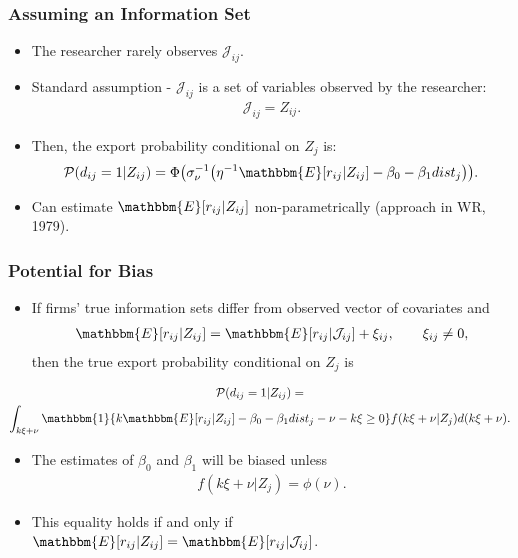 \begin{frame}
\frametitle{Assuming an Information Set}

\begin{itemize}
	\item The researcher rarely observes $\mathcal{J}_{ij}$.
	\item Standard assumption - $\mathcal{J}_{ij}$ is a set of variables observed by the researcher:
	\begin{align*}
	\mathcal{J}_{ij}=Z_{ij}.
	\end{align*}
	\item Then, the export probability conditional on $Z_{j}$ is:
	\begin{align*}
	\mathcal{P}(d_{ij}=1|Z_{ij})=\Phi\big(\sigma_{\nu}^{-1}\big(\eta^{-1}\mathbbm{E}[r_{ij}|Z_{ij}]-\beta_{0}-\beta_{1}dist_{j}\big)\big).
	\end{align*}
	\item Can estimate $\mathbbm{E}[r_{ij}|Z_{ij}]$ non-parametrically (approach in WR, 1979).
\end{itemize}
\end{frame}
\begin{frame}[label=info_sets]
\frametitle{Potential for Bias}

\begin{itemize}
	\item If firms' true information sets differ from observed vector of covariates and
	\begin{align*}
	\mathbbm{E}[r_{ij}|Z_{ij}]=\mathbbm{E}[r_{ij}|\mathcal{J}_{ij}]+\xi_{ij},\qquad\xi_{ij}\neq0,
	\end{align*}
	then the true export probability conditional on $Z_{j}$ is 
\end{itemize}	
	\begin{gather*}
	\mathcal{P}(d_{ij}=1|Z_{ij})=\\
	\int_{k\xi+\nu}\mathbbm{1}\{k\mathbbm{E}[r_{ij}|Z_{ij}]-\beta_{0}-\beta_{1}dist_{j}-\nu-k\xi\geq 0\}f(k\xi+\nu|Z_{j})d(k\xi+\nu).
	\end{gather*}
\begin{itemize}
	\item The estimates of $\beta_{0}$ and $\beta_{1}$ will be biased unless 
	\begin{align*}
	f(k\xi+\nu|Z_{j})=\phi(\nu).
	\end{align*}
	\item This equality holds if and only if $\mathbbm{E}[r_{ij}|Z_{ij}]=\mathbbm{E}[r_{ij}|\mathcal{J}_{ij}]$.
\end{itemize}
\end{frame}

